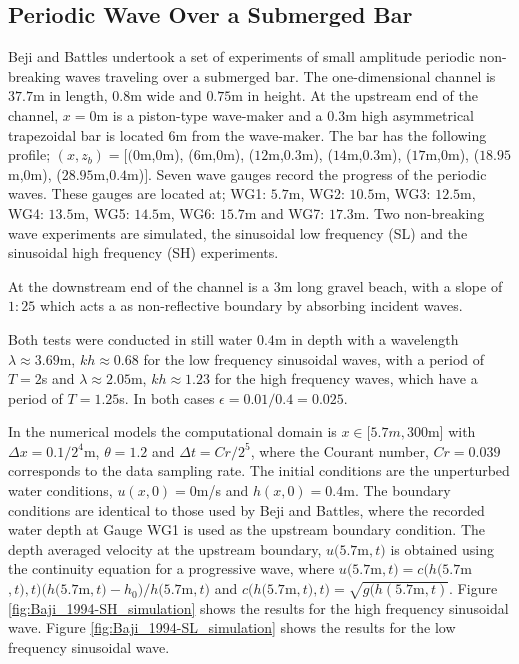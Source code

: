\documentclass[preprint,sort&compress,1p]{article}
\begin{document}
\subsection{Periodic Wave Over a Submerged Bar}
\label{Oscillatory Wave Over a Submerged Bar}

Beji and Battles\cite{Batji-Battjes-1994-1} undertook a set of experiments of small amplitude periodic non-breaking waves traveling over a submerged bar. The one-dimensional channel is $37.7$m in length, $0.8$m wide and $0.75$m in height. At the upstream end of the channel, $x = 0$m is a piston-type wave-maker and a $0.3$m high asymmetrical trapezoidal bar is located $6$m from the wave-maker. The bar has the following profile; $(x,z_b) = [(0$m,$0$m), ($6$m,$0$m), ($12$m,$0.3$m), ($14$m,$0.3$m), ($17$m,$0$m), ($18.95$m,$0$m), ($28.95$m,$0.4$m)$]$. Seven wave gauges record the progress of the periodic waves. These gauges are located at; WG1: $5.7$m, WG2: $10.5$m, WG3: $12.5$m, WG4: $13.5$m, WG5: $14.5$m, WG6: $15.7$m and WG7: $17.3$m. Two non-breaking wave experiments are simulated, the sinusoidal low frequency (SL) and the sinusoidal high frequency (SH) experiments.

At the downstream end of the channel is a $3$m long gravel beach, with a slope of $1:25$ which acts a as non-reflective boundary by absorbing incident waves.

Both tests were conducted in still water $0.4$m in depth with a wavelength $\lambda \approx 3.69$m, $kh \approx  0.68$ for the low frequency sinusoidal waves, with a period of $T = 2$s and $\lambda \approx 2.05$m, $kh \approx  1.23$ for the high frequency waves, which have a period of $T = 1.25$s. In both cases $\epsilon = 0.01/0.4 = 0.025$.

In the numerical models the computational domain is $x \in[5.7m,300$m$]$ with $\Delta x = 0.1/2^4$m, $\theta = 1.2$ and $\Delta t = Cr/2^5$, where the Courant number, $Cr = 0.039$  corresponds to the data sampling rate. The initial conditions are the unperturbed water conditions, $u(x,0) = 0$m/s and $h(x,0) = 0.4$m. The boundary conditions are identical to those used by Beji and Battles\cite{Batji-Battjes-1994-1}, where the recorded  water depth at Gauge WG1 is used as the upstream  boundary condition. The depth averaged velocity at the upstream boundary, $u(5.7$m$,t)$ is obtained using the continuity equation for a progressive wave, where $u(5.7$m$,t) = c(h(5.7$m$,t),t) (h(5.7$m$,t) - h_0)/h(5.7$m$,t)$ and $c(h(5.7$m$,t),t) = \sqrt{g (h(5.7\text{m},t)}$.  Figure \ref{fig:Baji_1994-SH_simulation} shows the results for the high frequency sinusoidal wave. Figure \ref{fig:Baji_1994-SL_simulation} shows the results for the low frequency sinusoidal wave.
\end{document}
